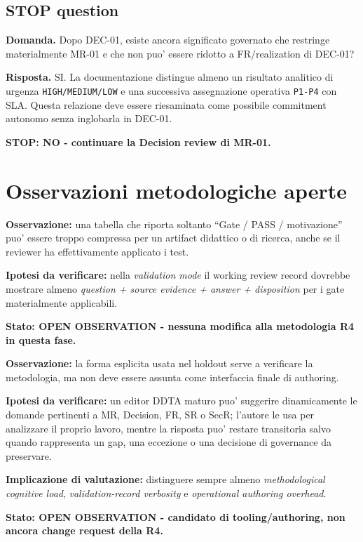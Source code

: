 \documentclass[11pt,a4paper]{article}
\begin{document}
\subsection{STOP question}
\begin{ddtacheck}
\textbf{Domanda.} Dopo DEC-01, esiste ancora significato governato che restringe materialmente MR-01 e che non puo' essere ridotto a FR/realization di DEC-01?
\end{ddtacheck}

\textbf{Risposta.} SI. La documentazione distingue almeno un risultato analitico di urgenza \texttt{HIGH/MEDIUM/LOW} e una successiva assegnazione operativa \texttt{P1-P4} con SLA. Questa relazione deve essere riesaminata come possibile commitment autonomo senza inglobarla in DEC-01.

\textbf{STOP: NO - continuare la Decision review di MR-01.}

\section{Osservazioni metodologiche aperte}

\begin{ddtaworking}[title={OBS-DDTA-DERMA-01 - Gate visibility in validation mode}]
\textbf{Osservazione:} una tabella che riporta soltanto ``Gate / PASS / motivazione'' puo' essere troppo compressa per un artifact didattico o di ricerca, anche se il reviewer ha effettivamente applicato i test.

\textbf{Ipotesi da verificare:} nella \emph{validation mode} il working review record dovrebbe mostrare almeno \emph{question + source evidence + answer + disposition} per i gate materialmente applicabili.

\textbf{Stato: OPEN OBSERVATION - nessuna modifica alla metodologia R4 in questa fase.}
\end{ddtaworking}

\begin{ddtaworking}[title={OBS-DDTA-DERMA-02 - Validation mode vs assisted authoring mode}]
\textbf{Osservazione:} la forma esplicita usata nel holdout serve a verificare la metodologia, ma non deve essere assunta come interfaccia finale di authoring.

\textbf{Ipotesi da verificare:} un editor DDTA maturo puo' suggerire dinamicamente le domande pertinenti a MR, Decision, FR, SR o SecR; l'autore le usa per analizzare il proprio lavoro, mentre la risposta puo' restare transitoria salvo quando rappresenta un gap, una eccezione o una decisione di governance da preservare.

\textbf{Implicazione di valutazione:} distinguere sempre almeno \emph{methodological cognitive load}, \emph{validation-record verbosity} e \emph{operational authoring overhead}.

\textbf{Stato: OPEN OBSERVATION - candidato di tooling/authoring, non ancora change request della R4.}
\end{ddtaworking}
\end{document}

